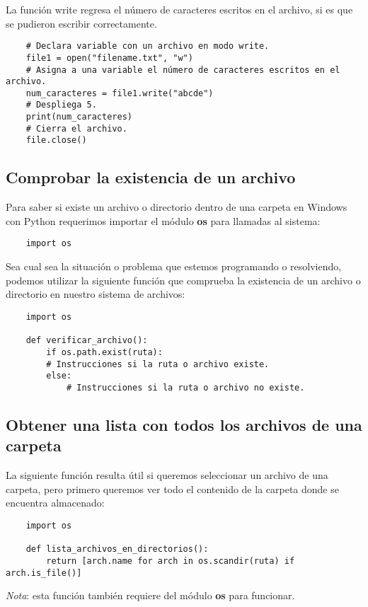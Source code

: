 La función write regresa el número de caracteres escritos en el archivo, si es que se pudieron escribir correctamente.
\begin{lstlisting}
    # Declara variable con un archivo en modo write.
    file1 = open("filename.txt", "w")
    # Asigna a una variable el número de caracteres escritos en el archivo.
    num_caracteres = file1.write("abcde")
    # Despliega 5.
    print(num_caracteres)
    # Cierra el archivo.
    file.close()
\end{lstlisting}


\subsection{Comprobar la existencia de un archivo}

Para saber si existe un archivo o directorio dentro de una carpeta en Windows con Python requerimos importar el módulo \textbf{os} para llamadas al sistema:
\begin{lstlisting}
    import os
\end{lstlisting}

Sea cual sea la situación o problema que estemos programando o resolviendo, podemos utilizar la siguiente función que comprueba la existencia de un archivo o directorio en nuestro sistema de archivos:
\begin{lstlisting}
    import os

    def verificar_archivo():
        if os.path.exist(ruta):
   	    # Instrucciones si la ruta o archivo existe.
        else:
            # Instrucciones si la ruta o archivo no existe.
\end{lstlisting}


\subsection{Obtener una lista con todos los archivos de una carpeta}

La siguiente función resulta útil si queremos seleccionar un archivo de una carpeta, pero primero queremos ver todo el contenido de la carpeta donde se encuentra almacenado:
\begin{lstlisting}
    import os

    def lista_archivos_en_directorios():
        return [arch.name for arch in os.scandir(ruta) if arch.is_file()]
\end{lstlisting}

\textit{Nota}: esta función también requiere del módulo \textbf{os} para funcionar.


